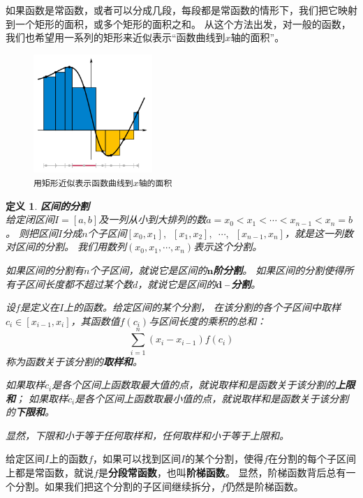\documentclass[12pt,UTF8]{ctexbook}
\newtheorem{df}{定义}[section]
\begin{document}
\begin{appendix}
如果函数是常函数，或者可以分成几段，每段都是常函数的情形下，我们把它映射到一个矩形的面积，或多个矩形的面积之和。
从这个方法出发，对一般的函数，我们也希望用一系列的矩形来近似表示“函数曲线到$x$轴的面积”。

\begin{figure}[h] %
    \vspace{4pt}
    \centering
    \includegraphics[width=0.4\textwidth]{tu/积分定义4.png}
    \caption*{\texttt{用矩形近似表示函数曲线到$x$轴的面积}}
\end{figure}

\begin{df}{\textbf{区间的分割}}
    \mbox{} \\
    给定闭区间$I=[a, b]$及一列从小到大排列的数$a = x_0 < x_1 < \cdots < x_{n-1} < x_n = b$。
    则把区间$I$分成$n$个子区间$[x_0, x_1], \,\,\, [x_1, x_2], \,\,\,\cdots, \,\,\,[x_{n-1}, x_n]$，就是这一列数对区间的分割。
    我们用数列$(x_0, x_1, \cdots, x_n)$表示这个分割。

    如果区间的分割有$n$个子区间，就说它是区间的$\boldsymbol{n}$\textbf{阶分割}。
    如果区间的分割使得所有子区间长度都不超过某个数$d$，就说它是区间的$\boldsymbol{d}$\textbf{\,–\,分割}。

    设$f$是定义在$I$上的函数。给定区间的某个分割，
    在该分割的各个子区间中取样$c_i\in [x_{i-1}, x_{i}]$，其函数值$f(c_i)$与区间长度的乘积的总和：
    $$ \sum_{i=1}^n (x_i - x_{i-1}) f(c_i) $$
    称为函数关于该分割的\textbf{取样和}。

    如果取样$c_i$是各个区间上函数取最大值的点，就说取样和是函数关于该分割的\textbf{上限和}；
    如果取样$c_i$是各个区间上函数取最小值的点，就说取样和是函数关于该分割的\textbf{下限和}。

    显然，下限和小于等于任何取样和，任何取样和小于等于上限和。

\end{df}

给定区间$I$上的函数$f$，如果可以找到区间$I$的某个分割，使得$f$在分割的每个子区间上都是常函数，就说$f$是\textbf{分段常函数}，也叫\textbf{阶梯函数}。
显然，阶梯函数背后总有一个分割。如果我们把这个分割的子区间继续拆分，$f$仍然是阶梯函数。


\end{appendix}
\end{document}
